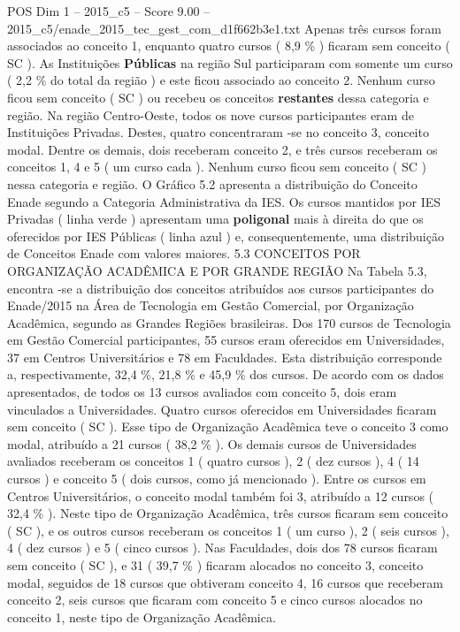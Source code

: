 \begin{textsample}{POS Dim 1 – 2015\_c5 – Score 9.00 – 2015\_c5/enade\_2015\_tec\_gest\_com\_d1f662b3e1.txt}
Apenas três cursos foram associados ao conceito 1, enquanto quatro cursos ( 8,9 \% ) ficaram sem conceito ( SC ).
As Instituições \textbf{Públicas} na região Sul participaram com somente um curso ( 2,2 \% do total da região ) e este ficou associado ao conceito 2.
Nenhum curso ficou sem conceito ( SC ) ou recebeu os conceitos \textbf{restantes} dessa categoria e região.
Na região Centro-Oeste, todos os nove cursos participantes eram de Instituições Privadas.
Destes, quatro concentraram -se no conceito 3, conceito modal.
Dentre os demais, dois receberam conceito 2, e três cursos receberam os conceitos 1, 4 e 5 ( um curso cada ).
Nenhum curso ficou sem conceito ( SC ) nessa categoria e região.
O Gráfico 5.2 apresenta a distribuição do Conceito Enade segundo a Categoria Administrativa da IES.
Os cursos mantidos por IES Privadas ( linha verde ) apresentam uma \textbf{poligonal} mais à direita do que os oferecidos por IES Públicas ( linha azul ) e, consequentemente, uma distribuição de Conceitos Enade com valores maiores. 5.3 CONCEITOS POR ORGANIZAÇÃO ACADÊMICA E POR GRANDE REGIÃO Na Tabela 5.3, encontra -se a distribuição dos conceitos atribuídos aos cursos participantes do Enade/2015 na Área de Tecnologia em Gestão Comercial, por Organização Acadêmica, segundo as Grandes Regiões brasileiras.
Dos 170 cursos de Tecnologia em Gestão Comercial participantes, 55 cursos eram oferecidos em Universidades, 37 em Centros Universitários e 78 em Faculdades.
Esta distribuição corresponde a, respectivamente, 32,4 \%, 21,8 \% e 45,9 \% dos cursos.
De acordo com os dados apresentados, de todos os 13 cursos avaliados com conceito 5, dois eram vinculados a Universidades.
Quatro cursos oferecidos em Universidades ficaram sem conceito ( SC ).
Esse tipo de Organização Acadêmica teve o conceito 3 como modal, atribuído a 21 cursos ( 38,2 \% ).
Os demais cursos de Universidades avaliados receberam os conceitos 1 ( quatro cursos ), 2 ( dez cursos ), 4 ( 14 cursos ) e conceito 5 ( dois cursos, como já mencionado ).
Entre os cursos em Centros Universitários, o conceito modal também foi 3, atribuído a 12 cursos ( 32,4 \% ).
Neste tipo de Organização Acadêmica, três cursos ficaram sem conceito ( SC ), e os outros cursos receberam os conceitos 1 ( um curso ), 2 ( seis cursos ), 4 ( dez cursos ) e 5 ( cinco cursos ).
Nas Faculdades, dois dos 78 cursos ficaram sem conceito ( SC ), e 31 ( 39,7 \% ) ficaram alocados no conceito 3, conceito modal, seguidos de 18 cursos que obtiveram conceito 4, 16 cursos que receberam conceito 2, seis cursos que ficaram com conceito 5 e cinco cursos alocados no conceito 1, neste tipo de Organização Acadêmica.

\end{textsample}
